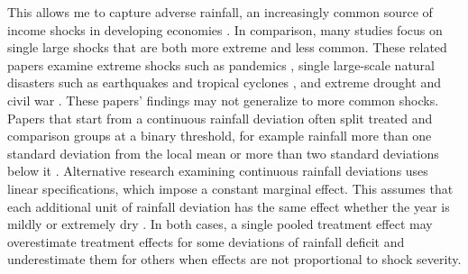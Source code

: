 \documentclass[12pt]{article}
\begin{document}
This allows me to capture adverse rainfall, an increasingly common source of income shocks in developing economies \parencite{dinkelmanLongRunHealthRepercussions2017}. In comparison, many studies focus on single large shocks that are both more extreme and less common. These related papers examine extreme shocks such as pandemics \parencite{almond1918InfluenzaPandemic2006,kellyScourgeAsianFlu2011,beach1918InfluenzaPandemic2022}, single large-scale natural disasters such as earthquakes and tropical cyclones \parencite{carusoLongRunEffects2015,fujikiDisentanglingEffectsMultiple2015,deuchertTempestShortLongterm2015,dodlovaEffects2010Haiti2023}, and extreme drought and civil war \parencite{aldermanLongTermConsequences2006}. These papers' findings may not generalize to more common shocks. Papers that start from a continuous rainfall deviation often split treated and comparison groups at a binary threshold, for example rainfall more than one standard deviation from the local mean \parencite{skoufiasClimateVariabilityChild2012,adhvaryuHelpingChildrenCatch2024} or more than two standard deviations below it \parencite{hirvonenImpactEthiopias20152020,kudamatsuWeatherInfantMortality2012}. Alternative research examining continuous rainfall deviations uses linear specifications, which impose a constant marginal effect. This assumes that each additional unit of rainfall deviation has the same effect whether the year is mildly or extremely dry \parencite{macciniWeatherHealthSchooling2009,rochaWaterScarcityBirth2015}. In both cases, a single pooled treatment effect may overestimate treatment effects for some deviations of rainfall deficit and underestimate them for others when effects are not proportional to shock severity.
\end{document}
